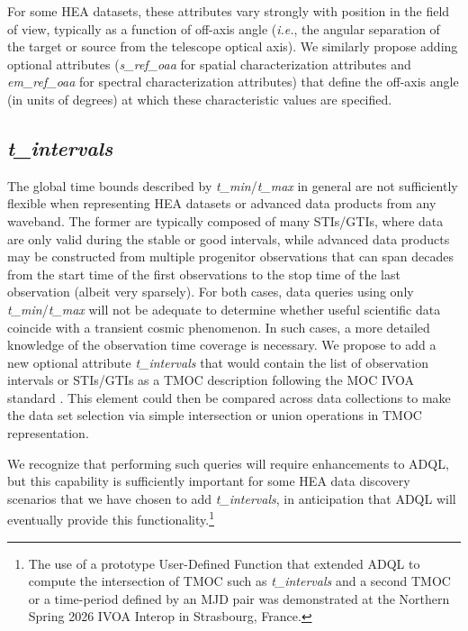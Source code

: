 \documentclass[11pt,a4paper]{ivoa}
\begin{document}
For some \gls{HEA} datasets, these attributes vary strongly with position in the field of view, typically as a function of off-axis angle ({\em i.e.\/}, the angular separation of the target or source from the telescope optical axis). We similarly propose adding optional attributes ({\em s\_ref\_oaa\/} for spatial characterization attributes and {\em em\_ref\_oaa\/} for spectral characterization attributes) that define the off-axis angle (in units of degrees) at which these characteristic values are specified.

\subsection{{\em t\_intervals}}

The global time bounds described by {\em t\_min\/}/{\em t\_max\/} in general are not sufficiently flexible when representing \gls{HEA} datasets or advanced data products from any waveband.  The former are typically composed of many \glspl{STI}/\glspl{GTI}, where data are only valid during the stable or good intervals, while advanced data products may be constructed from multiple progenitor observations that can span decades from the start time of the first observations to the stop time of the last observation (albeit very sparsely).  For both cases, data queries using only {\em t\_min\/}/{\em t\_max\/} will not be adequate to determine whether useful scientific data coincide with a transient cosmic phenomenon.  In such cases, a more detailed knowledge of the observation time coverage is necessary.  We propose to add a new optional attribute {\em t\_intervals\/} that would contain the list of observation intervals or \glspl{STI}/\glspl{GTI} as a TMOC description following the \gls{MOC} IVOA standard  \citep{2022ivoa.spec.0727F}. This element could then be compared across data collections to make the data set selection via simple intersection or union operations in TMOC representation.

We recognize that performing such queries will require enhancements to ADQL, but this capability is sufficiently important for some \gls{HEA} data discovery scenarios that we have chosen to add {\em t\_intervals\/}, in anticipation that ADQL will eventually provide this functionality.\footnote{The use of a prototype User-Defined Function that extended ADQL to compute the intersection of TMOC such as {\em t\_intervals} and a second TMOC or a time-period defined by an MJD pair was demonstrated at the Northern Spring 2026 IVOA Interop in Strasbourg, France.}
\end{document}
